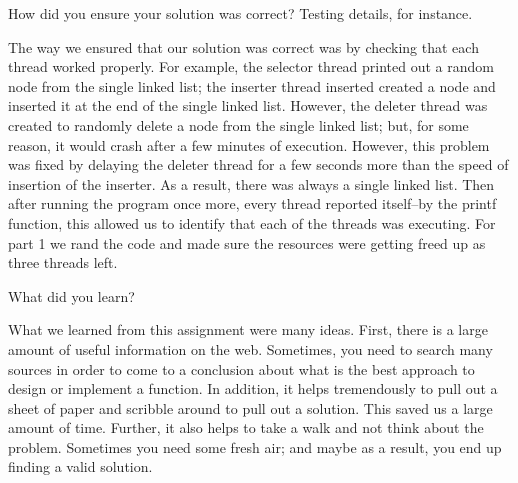 \documentclass{article}
\newenvironment{question}[2][Question]{\begin{trivlist}
\item[\hskip \labelsep {\bfseries #1}\hskip \labelsep {\bfseries #2.}]}{\end{trivlist}}
\begin{document}

\vspace{0.25in} %

\begin{question}{3}
How did you ensure your solution was correct? Testing details, for instance.
\end{question}
The way we ensured that our solution was correct was by checking that each thread worked properly. For example, the selector thread printed out a random node from the single linked list; the inserter thread inserted created a node and inserted it at the end of the single linked list. However, the deleter thread was created to randomly delete a node from the single linked list; but, for some reason, it would crash after a few minutes of execution. However, this problem was fixed by delaying the deleter thread for a few seconds more than the speed of insertion of the inserter. As a result, there was always a single linked list. Then after running the program once more, every thread reported itself--by the printf function, this allowed us to identify that each of the threads was executing. For part 1 we rand the code and made sure the resources were getting freed up as three threads left. 

\newpage


\vspace{0.25in}
\begin{question}{4}
What did you learn?
\end{question}
What we learned from this assignment were many ideas. First, there is a large amount of useful information on the web. Sometimes, you need to search many sources in order to come to a conclusion about what is the best approach to design or implement a function. In addition, it helps tremendously to pull out a sheet of paper and scribble around to pull out a solution. This saved us a large amount of time. Further, it also helps to take a walk and not think about the problem. Sometimes you need some fresh air; and maybe as a result, you end up finding a valid solution.

\end{document}

